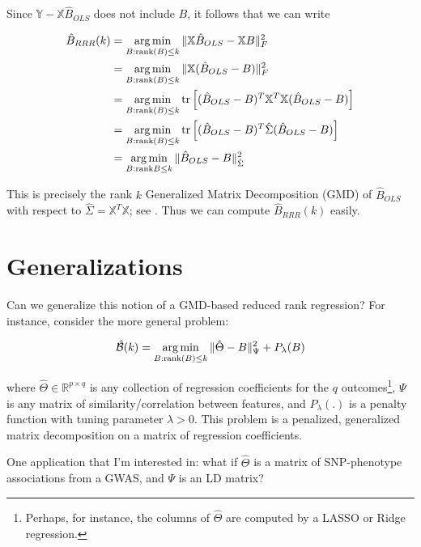 \documentclass{article}
\newcommand{\rank}{\textrm{rank}}
\newcommand{\tr}{\textrm{tr}}
\newcommand{\R}{\mathbb{R}}
\newcommand{\X}{\mathbb{X}}
\newcommand{\Y}{\mathbb{Y}}
\newcommand{\calB}{\mathcal{B}}
\newcommand{\argmin}{\mathop{\rm arg\,min}}
\begin{document}
Since $\Y - \X \hat{B}_{OLS}$ does not include $B$, it follows that we can write 

\begin{align*}
	\hat{B}_{RRR}(k) &= \argmin_{B: \rank(B) \leq k}\|\X \hat{B}_{OLS} - \X B \|_F^2 \\
	&= \argmin_{B: \rank(B) \leq k}\|\X (\hat{B}_{OLS} - B) \|_F^2 \\
	&= \argmin_{B: \rank(B) \leq k} \tr \left[(\hat{B}_{OLS} - B)^T\X^T\X(\hat{B}_{OLS} - B) \right] \\
	&= \argmin_{B: \rank(B) \leq k} \tr \left[(\hat{B}_{OLS} - B)^T\hat{\Sigma}(\hat{B}_{OLS} - B) \right] \\
	&= \argmin_{B :\rank{B} \leq k} \| \hat{B}_{OLS} - B \|_{\hat{\Sigma}}^2
\end{align*}

This is precisely the rank $k$ Generalized Matrix Decomposition (GMD) of $\hat{B}_{OLS}$
with respect to $\hat{\Sigma} = \X^T\X$; see \cite{allen_generalized_2014,wang_generalized_2021}. Thus we can compute
$\hat{B}_{RRR}(k)$ easily.

\section{Generalizations}

Can we generalize this notion of a GMD-based reduced rank regression? For
instance, consider the more general problem:

$$\hat{\calB}(k) = \argmin_{B: \rank(B) \leq k}\| \hat{\Theta} - B \|_{\Psi}^2 +
P_{\lambda}(B)$$

where $\hat{\Theta} \in \R^{p \times q}$ is any collection of regression
coefficients for the $q$ outcomes\footnote{Perhaps, for instance, the columns of
$\hat{\Theta}$ are computed by a LASSO or Ridge regression.}, $\Psi$ is any
matrix of similarity/correlation between
features, and $P_{\lambda}(.)$ is a penalty function with tuning parameter
$\lambda > 0$. This problem is a penalized, generalized matrix
decomposition \cite{witten_penalized_2009} on a matrix of regression coefficients. 

One application that I'm interested in: what if $\hat{\Theta}$ is a matrix of
SNP-phenotype associations from a GWAS, and $\Psi$ is an LD matrix?



\end{document}
